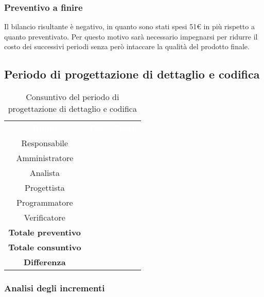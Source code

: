 \subsubsection{Preventivo a finire}
Il bilancio risultante è negativo, in quanto sono stati spesi 51€ in più rispetto a quanto preventivato. Per questo motivo sarà necessario impegnarsi per ridurre il costo dei successivi periodi senza però intaccare la qualità del prodotto finale.

\subsection{Periodo di progettazione di dettaglio e codifica}
\begin{table}[H]
\centering\renewcommand{\arraystretch}{1.5}
\caption{Consuntivo del periodo di progettazione di dettaglio e codifica}
\vspace{0.2cm}
\begin{tabular}{ c c c }
\rowcolor{redafk}
\textcolor{white}{\textbf{Ruolo}} & \textcolor{white}{\textbf{Ore}} &
\textcolor{white}{\textbf{Costo}}  \\
Responsabile 	&  &  \\
Amministratore 	&  	&  \\
Analista 		&   	&  \\
Progettista		&   	& \\
Programmatore	&  	& \\
Verificatore 	&  &  \\
\textbf{Totale preventivo} & &   \\
\textbf{Totale consuntivo} &  &   \\
\rowcolor{lastrowcolor}
\textbf{Differenza} & &  \\
\end{tabular}
\end{table}

\subsubsection{Analisi degli incrementi}

